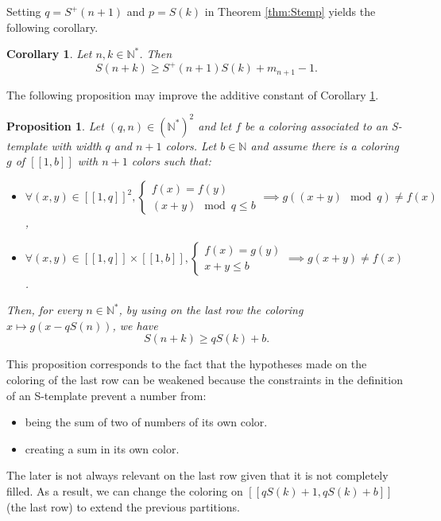 \documentclass{article}
\newtheorem{computational theorem}[definition]{Computational Theorem}
\newtheorem{corollary}[definition]{Corollary}
\newtheorem{proposition}[definition]{Proposition}
\begin{document}
Setting \(q = S^+(n+1)\) and \(p = S(k)\) in Theorem \ref{thm:Stemp} yields the following corollary.

\begin{corollary}
\label{cor:ineqS}
	Let \(n, k \in \mathbb{N}^*\). Then
	\[ S(n+k) \geqslant S^+(n+1)S(k) + m_{n+1} - 1.\]
\end{corollary}

The following proposition may improve the additive constant of Corollary \ref{cor:ineqS}.

\begin{proposition}
\label{prop:rafStemp}
Let \((q, n) \in \left(\mathbb{N}^* \right)^2\) and let \(f\) be a coloring associated to an S-template with width \(q\) and \(n+1\) 
colors. Let \(b \in \mathbb{N}\) and assume there is a coloring \(g\) of 
\([\![1, b]\!]\) with \(n+1\) colors such that:
	
\begin{itemize}
\item \(\forall (x, y) \in [\![1, q]\!]^2, \left\{
	\begin{array}{l}
		f(x) = f(y) \\
		(x + y) \mod q \leqslant b
	\end{array}
	\right. \implies g((x + y) \mod q) \neq f(x)\),
\item \(\forall (x, y) \in [\![1, q]\!] \times  [\![1, b]\!],  \left\{
	\begin{array}{l}
		f(x) = g(y) \\
		x + y \leqslant b
	\end{array}
	\right. \implies g(x + y) \neq f(x)\).
\end{itemize}
	
Then, for every \(n \in \mathbb{N}^*\), by using on the last row the coloring \(x \longmapsto g(x - q S(n))\), we have
\[ S(n+k) \geqslant q S(k) + b.\]
\end{proposition}
This proposition corresponds to the fact that the hypotheses made on the coloring of the last row can be weakened because 
the constraints in the definition of an S-template prevent a number from: 
\begin{itemize}
\item being the sum of two of numbers of its own color. 
\item creating a sum in its own color. 
\end{itemize}
The later is not always relevant on the last row given that it is not completely filled.
As a result, we can change the coloring on \([\![ q S(k) + 1,  q S(k) + b]\!]\) (the last row) to extend the previous partitions.
\newline
\end{document}
